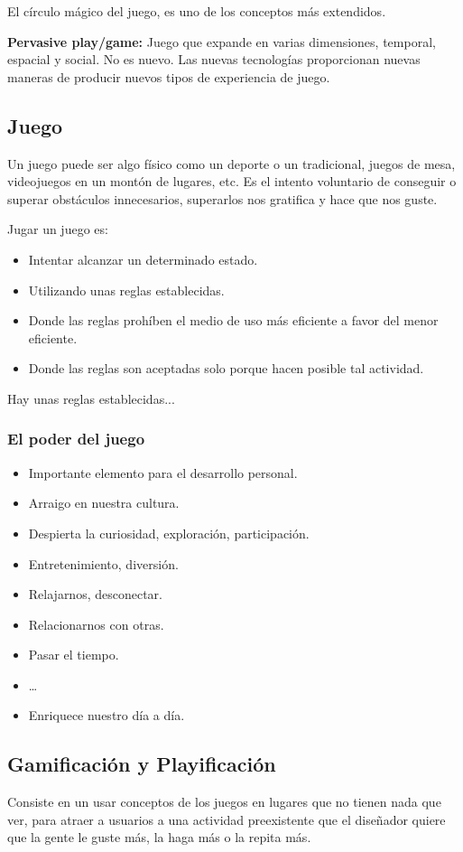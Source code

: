 \documentclass[12pt]{report} %
\begin{document}
El círculo mágico del juego, es uno de los conceptos más extendidos.

\textbf{Pervasive play/game:} Juego que expande en varias dimensiones, temporal, espacial y social. No es nuevo. Las nuevas tecnologías proporcionan nuevas maneras de producir nuevos tipos de experiencia de juego.

\subsection{Juego}

Un juego puede ser algo físico como un deporte o un tradicional, juegos de mesa, videojuegos en un montón de lugares, etc. Es el intento voluntario de conseguir o superar obstáculos innecesarios, superarlos nos gratifica y hace que nos guste.

Jugar un juego es:
\begin{itemize}
  \item Intentar alcanzar un determinado estado.
  \item Utilizando unas reglas establecidas.
  \item Donde las reglas prohíben el medio de uso más eficiente a favor del menor eficiente.
  \item Donde las reglas son aceptadas solo porque hacen posible tal actividad.
\end{itemize}
  Hay unas reglas establecidas...

\subsubsection{El poder del juego}
\begin{itemize}
  \item Importante elemento para el desarrollo personal.
  \item Arraigo en nuestra cultura.
  \item Despierta la curiosidad, exploración, participación.
  \item Entretenimiento, diversión.
  \item Relajarnos, desconectar.
  \item Relacionarnos con otras.
  \item Pasar el tiempo.
  \item \dots
  \item Enriquece nuestro día a día.

\end{itemize}

\subsection{Gamificación y Playificación}
Consiste en un usar conceptos de los juegos en lugares que no tienen nada que ver, para atraer a usuarios a una actividad preexistente que el diseñador quiere que la gente le guste más, la haga más o la repita más.
\end{document}
